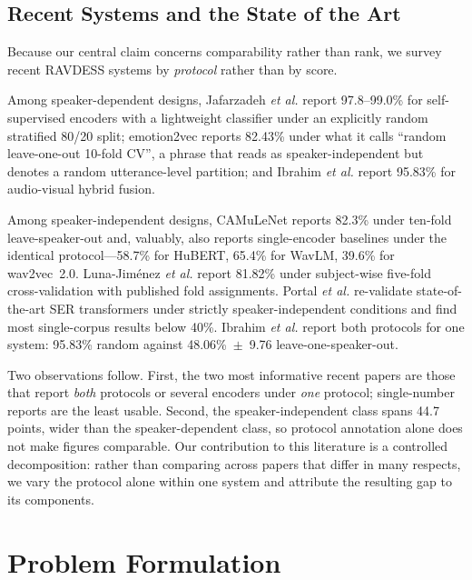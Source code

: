 \documentclass[journal,onecolumn,11pt,draftclsnofoot]{IEEEtran}   %
\begin{document}
\subsection{Recent Systems and the State of the Art}
\label{sec:sota}
Because our central claim concerns comparability rather than rank, we survey
recent RAVDESS systems by \emph{protocol} rather than by score.

Among speaker-dependent designs, Jafarzadeh \emph{et al.}
\cite{jafarzadeh2024ssl} report 97.8--99.0\% for self-supervised encoders with a
lightweight classifier under an explicitly random stratified 80/20 split;
emotion2vec \cite{ma2024emotion2vec} reports 82.43\% under what it calls
``random leave-one-out 10-fold CV'', a phrase that reads as speaker-independent
but denotes a random utterance-level partition; and Ibrahim \emph{et al.}
\cite{ibrahim2026multimodal} report 95.83\% for audio-visual hybrid fusion.

Among speaker-independent designs, CAMuLeNet \cite{goel2024camulenet} reports
82.3\% under ten-fold leave-speaker-out and, valuably, also reports
single-encoder baselines under the identical protocol---58.7\% for HuBERT,
65.4\% for WavLM, 39.6\% for wav2vec~2.0. Luna-Jim{\'e}nez \emph{et al.}
\cite{lunajimenez2022multimodal} report 81.82\% under subject-wise five-fold
cross-validation with published fold assignments. Portal \emph{et al.}
\cite{portal2025benchmarking} re-validate state-of-the-art SER transformers
under strictly speaker-independent conditions and find most single-corpus
results below 40\%. Ibrahim \emph{et al.} \cite{ibrahim2026multimodal} report
both protocols for one system: 95.83\% random against 48.06\%~$\pm$~9.76
leave-one-speaker-out.

Two observations follow. First, the two most informative recent papers are
those that report \emph{both} protocols or several encoders under \emph{one}
protocol; single-number reports are the least usable. Second, the
speaker-independent class spans 44.7 points, wider than the speaker-dependent
class, so protocol annotation alone does not make figures comparable. Our
contribution to this literature is a controlled decomposition: rather than
comparing across papers that differ in many respects, we vary the protocol alone
within one system and attribute the resulting gap to its components.

\section{Problem Formulation}
\label{sec:formulation}
\end{document}
